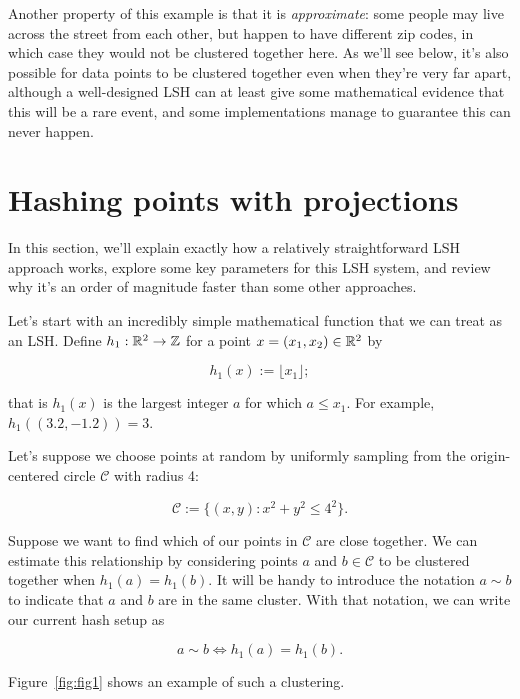 \documentclass[20pt,]{extarticle}
\begin{document}
Another property of this example is that it is \emph{approximate}: some
people may live across the street from each other, but happen to have
different zip codes, in which case they would not be clustered together
here. As we'll see below, it's also possible for data points to be
clustered together even when they're very far apart, although a
well-designed LSH can at least give some mathematical evidence that this
will be a rare event, and some implementations manage to guarantee this
can never happen.

\section{Hashing points with
projections}\label{hashing-points-with-projections}

In this section, we'll explain exactly how a relatively straightforward
LSH approach works, explore some key parameters for this LSH system, and
review why it's an order of magnitude faster than some other approaches.

Let's start with an incredibly simple mathematical function that we can
treat as an LSH. Define \(h_1:\mathbb{R}^2 \to \mathbb{Z}\) for a point
\(x=(x_1, x_2)\in\mathbb{R}^2\) by

\[ h_1(x) := \lfloor x_1 \rfloor; \]

that is \(h_1(x)\) is the largest integer \(a\) for which \(a\le x_1.\)
For example, \(h_1((3.2, -1.2)) = 3.\)

Let's suppose we choose points at random by uniformly sampling from the
origin-centered circle \(\mathcal C\) with radius 4:

\[ \mathcal C := \{ (x, y) : x^2 + y^2 \le 4^2 \}. \]

Suppose we want to find which of our points in \(\mathcal C\) are close
together. We can estimate this relationship by considering points \(a\)
and \(b \in \mathcal C\) to be clustered together when
\(h_1(a) = h_1(b).\) It will be handy to introduce the notation
\(a \sim b\) to indicate that \(a\) and \(b\) are in the same cluster.
With that notation, we can write our current hash setup as

\[ a \sim b \iff h_1(a) = h_1(b). \]

Figure~\ref{fig:fig1} shows an example of such a clustering.
\end{document}
